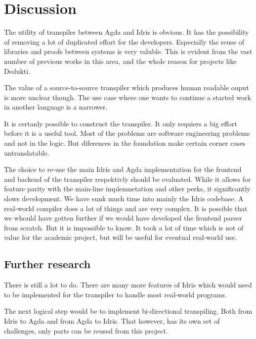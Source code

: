 \section{Discussion}
The utility of transpiler between Agda and Idris is obvious. It has the
possibility of removing a lot of duplicated effort for the developers.
Especially the reuse of libraries and proofs between systems is very valuble.
This is evident from the vast number of previous works in this area, and the
whole reason for projects like Dedukti.~\cite{assaf2016dedukti}

The value of a source-to-source transpiler which produces human readable ouput
is more unclear though. The use case where one wants to continue a started work
in another language is a narrower.

It is certanly possible to construct the transpiler. It only requiers a big
effort before it is a useful tool. Most of the problems are software
engineering problems and not in the logic. But diferences in the foundation
make certain corner cases untranslatable.

The choice to re-use the main Idris and Agda implementation for the frontend
and backend of the transpiler respektivly should be evaluated. While it allows
for feature parity with the main-line implemnetation and other perks, it
significantly slows development. We have sunk much time into mainly the Idris
codebase. A real-world compiler does a lot of things and are very
complex. It is possible that we
whould have gotten further if we would have developed the frontend parser from
scratch. But it is impossible to know. It took a lot of time which is not of
value for the academic project, but will be useful for eventual real-world use.


\subsection{Further research}
There is still a lot to do. There are many more features of Idris which would
need to be implemented for the transpiler to handle most real-world programs.

The next logical step would be to implement bi-directional transpiling. Both
from Idris to Agda and from Agda to Idris. That however, has its own set of
challenges, only parts can be reused from this project.

